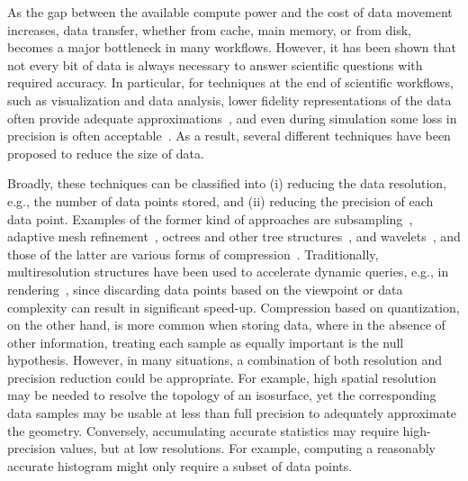 As the gap between the available compute power and the cost of data movement increases, data
transfer, whether from cache, main memory, or from disk, becomes a major bottleneck in many
workflows. However, it has been shown that not every bit of data is always necessary to answer
scientific questions with required accuracy. In particular, for techniques at the end of scientific
workflows, such as visualization and data analysis, lower fidelity representations of the data often
provide adequate approximations~\cite{woodring2011,covra2012,compression_sim2013}, and even during
simulation some loss in precision is often
acceptable~\cite{compression_sim2013,doi:10.1177/1094342018762036}. As a result, several different
techniques have been proposed to reduce the size of data. 

Broadly, these techniques can be classified into (i) reducing the data resolution, e.g., the number
of data points stored, and (ii) reducing the precision of each data point. Examples of the former
kind of approaches are subsampling~\cite{idx2001}, adaptive mesh refinement~\cite{amr1989}, octrees
and other tree structures~\cite{hierarchical1984}, and wavelets~\cite{woodring2011}, and those of
the latter are various forms of
compression~\cite{fpzip,isabela,zfp2014,sz,vq1992,compression_domain2003,sqe}. Traditionally,
multiresolution structures have been used to accelerate dynamic queries, e.g., in
rendering~\cite{multires_octree1999}, since discarding data points based on the viewpoint or data
complexity can result in significant speed-up. Compression based on quantization, on the other hand,
is more common when storing data, where in the absence of other information, treating each sample as
equally important is the null hypothesis. However, in many situations, a combination of both
resolution and precision reduction could be appropriate. For example, high spatial resolution may be
needed to resolve the topology of an isosurface, yet the corresponding data samples may be usable at
less than full precision to adequately approximate the geometry. Conversely, accumulating accurate
statistics may require high-precision values, but at low resolutions. For example, computing a
reasonably accurate histogram might only require a subset of data points.

